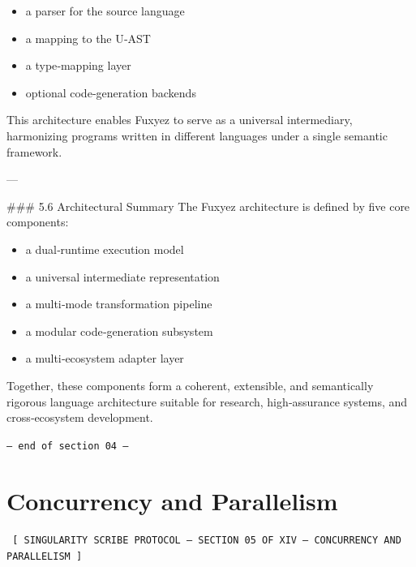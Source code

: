 \begin{itemize}
  \item a parser for the source language  
  \item a mapping to the U‑AST  
  \item a type‑mapping layer  
  \item optional code‑generation backends  
\end{itemize}

This architecture enables Fuxyez to serve as a universal intermediary, harmonizing programs written in different languages under a single semantic framework.

---

\#\#\# 5.6 Architectural Summary  
The Fuxyez architecture is defined by five core components:

\begin{itemize}
  \item a dual‑runtime execution model  
  \item a universal intermediate representation  
  \item a multi‑mode transformation pipeline  
  \item a modular code‑generation subsystem  
  \item a multi‑ecosystem adapter layer  
\end{itemize}

Together, these components form a coherent, extensible, and semantically rigorous language architecture suitable for research, high‑assurance systems, and cross‑ecosystem development.
    
    \vspace{1cm}
    \begin{center}
    \color{alienPurple}\texttt{--- end of section 04 ---}
    \end{center}
    \clearpage
    

    \chapter*{Concurrency and Parallelism}
    
    
    \begin{glyphbox}
    \centering
    \color{neonCyan}\fontsize{8}{10}\selectfont\texttt{
    [ SINGULARITY SCRIBE PROTOCOL -- SECTION 05 OF XIV -- CONCURRENCY AND PARALLELISM ]
    }
    \end{glyphbox}
    \vspace{0.3cm}
    
